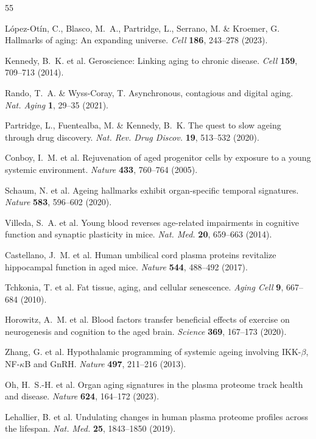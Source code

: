 \documentclass[11pt,a4paper]{article}
\begin{document}
\begin{thebibliography}{55}

L\'{o}pez-Ot\'{i}n, C., Blasco, M.~A., Partridge, L., Serrano, M. \& Kroemer, G.
Hallmarks of aging: An expanding universe.
\textit{Cell} \textbf{186}, 243--278 (2023).

Kennedy, B.~K. et al.
Geroscience: Linking aging to chronic disease.
\textit{Cell} \textbf{159}, 709--713 (2014).

Rando, T.~A. \& Wyss-Coray, T.
Asynchronous, contagious and digital aging.
\textit{Nat. Aging} \textbf{1}, 29--35 (2021).

Partridge, L., Fuentealba, M. \& Kennedy, B.~K.
The quest to slow ageing through drug discovery.
\textit{Nat. Rev. Drug Discov.} \textbf{19}, 513--532 (2020).

Conboy, I.~M. et al.
Rejuvenation of aged progenitor cells by exposure to a young systemic environment.
\textit{Nature} \textbf{433}, 760--764 (2005).

Schaum, N. et al.
Ageing hallmarks exhibit organ-specific temporal signatures.
\textit{Nature} \textbf{583}, 596--602 (2020).

Villeda, S.~A. et al.
Young blood reverses age-related impairments in cognitive function and synaptic plasticity in mice.
\textit{Nat. Med.} \textbf{20}, 659--663 (2014).

Castellano, J.~M. et al.
Human umbilical cord plasma proteins revitalize hippocampal function in aged mice.
\textit{Nature} \textbf{544}, 488--492 (2017).

Tchkonia, T. et al.
Fat tissue, aging, and cellular senescence.
\textit{Aging Cell} \textbf{9}, 667--684 (2010).

Horowitz, A.~M. et al.
Blood factors transfer beneficial effects of exercise on neurogenesis and cognition to the aged brain.
\textit{Science} \textbf{369}, 167--173 (2020).

Zhang, G. et al.
Hypothalamic programming of systemic ageing involving IKK-$\beta$, NF-$\kappa$B and GnRH.
\textit{Nature} \textbf{497}, 211--216 (2013).

Oh, H.~S.-H. et al.
Organ aging signatures in the plasma proteome track health and disease.
\textit{Nature} \textbf{624}, 164--172 (2023).

Lehallier, B. et al.
Undulating changes in human plasma proteome profiles across the lifespan.
\textit{Nat. Med.} \textbf{25}, 1843--1850 (2019).


\end{thebibliography}
\end{document}
